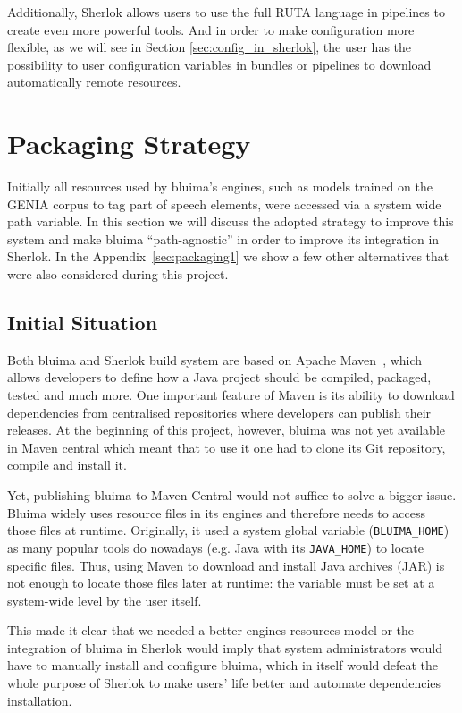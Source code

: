 \documentclass{article}
\newcommand{\VAR}[1]{\mbox{\texttt{#1}}}
\newcommand{\JAR}{JAR\xspace}
\begin{document}
Additionally, Sherlok allows users to use the full RUTA language in pipelines to create even more
powerful tools. And in order to make configuration more flexible, as we will see in Section
\ref{sec:config_in_sherlok}, the user has the possibility to user configuration variables in bundles
or pipelines to download automatically remote resources.

\section{Packaging Strategy}
\label{sec:packaging2}

Initially all resources used by bluima's engines, such as models trained on the GENIA corpus
\cite{genia} to tag part of speech elements, were accessed via a system wide path variable. In this
section we will discuss the adopted strategy to improve this system and make bluima
``path-agnostic'' in order to improve its integration in Sherlok. In the
Appendix~\ref{sec:packaging1} we show a few other alternatives that were also considered during this
project.

\subsection{Initial Situation}

Both bluima and Sherlok build system are based on Apache Maven~\cite{maven}, which allows developers
to define how a Java project should be compiled, packaged, tested and much more. One important
feature of Maven is its ability to download dependencies from centralised repositories where
developers can publish their releases. At the beginning of this project, however, bluima was not yet
available in Maven central which meant that to use it one had to clone its Git repository, compile
and install it.

Yet, publishing bluima to Maven Central would not suffice to solve a bigger issue. Bluima widely
uses resource files in its engines and therefore needs to access those files at runtime. Originally,
it used a system global variable (\VAR{BLUIMA\_HOME}) as many popular tools do nowadays (e.g. Java
with its \VAR{JAVA\_HOME}) to locate specific files. Thus, using Maven to download and install Java
archives (\JAR) is not enough to locate those files later at runtime: the variable must be set at a
system-wide level by the user itself.

This made it clear that we needed a better engines-resources model or the integration of bluima in
Sherlok would imply that system administrators would have to manually install and configure bluima,
which in itself would defeat the whole purpose of Sherlok to make users' life better and automate
dependencies installation.
\end{document}
